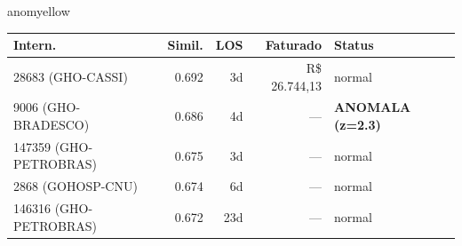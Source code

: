 \documentclass[a4paper,10pt]{article}
\begin{document}
\begin{anomalycard}[Internacao 13652 | GHO-PETROBRAS | MODERADO (z=2.12)]{anomyellow}
\begin{tabular}{l r r r l}\toprule\textbf{Intern.} & \textbf{Simil.} & \textbf{LOS} & \textbf{Faturado} & \textbf{Status} \\\midrule
28683 (GHO-CASSI) & 0.692 & 3d & R\$ 26.744,13 & \textcolor{jcubeblue}{normal} \\
9006 (GHO-BRADESCO) & 0.686 & 4d & --- & \textcolor{anomred}{\textbf{ANOMALA (z=2.3)}} \\
147359 (GHO-PETROBRAS) & 0.675 & 3d & --- & \textcolor{jcubeblue}{normal} \\
2868 (GOHOSP-CNU) & 0.674 & 6d & --- & \textcolor{jcubeblue}{normal} \\
146316 (GHO-PETROBRAS) & 0.672 & 23d & --- & \textcolor{jcubeblue}{normal} \\
\bottomrule\end{tabular}


\end{anomalycard}

\newpage
\end{document}
